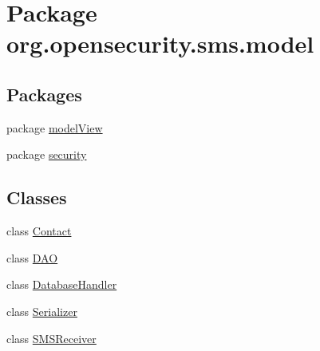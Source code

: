 \hypertarget{a00036}{\section{Package org.\+opensecurity.\+sms.\+model}
\label{a00036}
}
\subsection*{Packages}
\begin{DoxyCompactItemize}
\item 
package \hyperlink{a00037}{model\+View}
\item 
package \hyperlink{a00040}{security}
\end{DoxyCompactItemize}
\subsection*{Classes}
\begin{DoxyCompactItemize}
\item 
class \hyperlink{a00005}{Contact}
\item 
class \hyperlink{a00009}{D\+A\+O}
\item 
class \hyperlink{a00010}{Database\+Handler}
\item 
class \hyperlink{a00015}{Serializer}
\item 
class \hyperlink{a00016}{S\+M\+S\+Receiver}
\end{DoxyCompactItemize}
